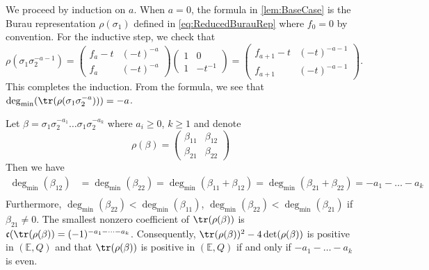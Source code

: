 \documentclass{amsart}
\makeatletter
\renewenvironment{proof}[1][\proofname]{%
   \par\pushQED{\qed}\normalfont%
   \topsep6\p@\@plus6\p@\relax
   \trivlist\item[\hskip\labelsep\bfseries#1\@addpunct{.}]%
   \ignorespaces
}{%
   \popQED\endtrivlist\@endpefalse
}
\makeatother
\begin{document}
\begin{proof}
    We proceed by induction on $a$. When $a = 0$, the formula in \cref{lem:BaseCase} is the Burau representation $\rho(\sigma_1)$ defined in \cref{eq:ReducedBurauRep} where $f_0 = 0$ by convention. For the inductive step, we check that
    \[
    \rho(\sigma_1\sigma_2^{-a-1}) =  \begin{pmatrix}
        f_a - t & (-t)^{-a}\\f_a  & (-t)^{-a}
    \end{pmatrix}\begin{pmatrix}
        1 & 0 \\ 1 & -t^{-1}
    \end{pmatrix} = \begin{pmatrix}
        f_{a+1} - t & (-t)^{-a-1}\\ f_{a+1}  & (-t)^{-a-1}
    \end{pmatrix}.
    \] 
    This completes the induction. From the formula, we see that $\deg_{\min}(\tr(\rho(\sigma_1\sigma_2^{-a}))) = -a$.
\end{proof}

\begin{prop}
    \label{prop:PositiveDiscriminant}
    Let $\beta =  \sigma_1\sigma_2^{-a_1}\dots   \sigma_1\sigma_2^{-a_k}$ where $a_i \geq 0$, $k\geq 1$ and denote
    \[
    \rho(\beta) = \begin{pmatrix} \beta_{11} & \beta_{12} \\ \beta_{21} & \beta_{22} \end{pmatrix}
    \]
    Then we have 
    \begin{equation}
        \begin{aligned}
        \label{eq:MinDegreeTrace}
        \deg_{\min}(\beta_{12}) &=\deg_{\min}(\beta_{22}) =   \deg_{\min}(\beta_{11} + \beta_{12}) = \deg_{\min}(\beta_{21} + \beta_{22}) = -a_1 -\dots - a_k  \\
    \end{aligned}
    \end{equation}
    Furthermore, $\deg_{\min}(\beta_{22}) < \deg_{\min}(\beta_{11})$, $\deg_{\min}(\beta_{22}) < \deg_{\min}(\beta_{21})$ if $\beta_{21} \neq 0$. The smallest nonzero coefficient of $\tr(\rho(\beta))$ is $\mathfrak{c}(\tr(\rho(\beta)) = (-1)^{-a_1-\dots-a_k}$. Consequently, $\tr(\rho(\beta))^2 - 4\det(\rho(\beta))$ is positive in $(\mathbb{E},Q)$ and that $\tr(\rho(\beta))$ is positive in $(\mathbb{E},Q)$ if and only if $-a_1-\dots-a_k$ is even.   
\end{prop}
\end{document}
